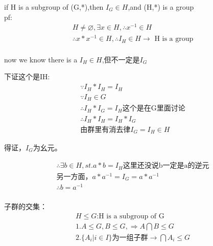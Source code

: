 \documentclass[12pt, a4paper]{article}  %
\begin{document}
if H is a subgroup of (G,*),then \(I_G \in H\),and (H,*) is a group\\
pf:\\
\begin{align}
    &H \neq \varnothing, \exists x\in H,\therefore x^{-1}\in H&\\
    &\therefore x*x^{-1}\in H,\therefore I_H\in H \rightarrow \text{ H is a group}&\\
\end{align}

now we know there is a \(I_H \in H\),但不一定是\(I_G \)

下证这个是IH:\\
\begin{align}
    &\because I_H*I_H=I_H&\\
    &\because I_H\in G&\\
    &\therefore I_H*I_G=I_H\text{这个是在G里面讨论}&\\
    &\therefore I_H*I_H=I_H*I_G&\\
    &\text{由群里有消去律}I_G=I_H\in H&
\end{align}

得证，\(I_G\)为幺元。

\begin{align}
    &\therefore \exists b\in H,st. a*b=I_H \text{这里还没说b一定是a的逆元}&\\
    &\text{另一方面，}a*a^{-1}=I_G=a*a^{-1}&\\
    &\therefore b=a^{-1}&\\
\end{align}

子群的交集：\\
\begin{align}
    &H\leqslant G\text{:H is a subgroup of G}&\\
    &1.A\leqslant G, B \leqslant G ,\Rightarrow A\bigcap B \leqslant G &\\
    &2. \{A_i| i\in I \}\text{为一组子群} \rightarrow \bigcap A_i \leqslant G&
\end{align}
\end{document}
